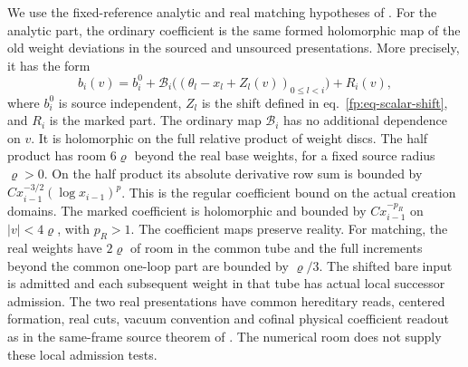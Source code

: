 \documentclass[11pt,letterpaper,reqno]{amsart}
\numberwithin{equation}{section}
\renewcommand{\eqref}[1]{\textup{eq.~\ref{#1}}}
\theoremstyle{definition}
\theoremstyle{remark}
\begin{document}
We use the fixed-reference analytic and real matching hypotheses of
\cite[Propositions~4.1 and~4.2]{SI}. For the analytic part, the
ordinary coefficient is the same formed holomorphic map of the
old weight deviations in the sourced and unsourced presentations.
More precisely, it has the form
\[
 b_i(v)=b_i^0+\mathcal B_i\bigl(
        (\theta_l-x_l+Z_l(v))_{0\le l<i}\bigr)+R_i(v),
\]
where \(b_i^0\) is source independent, \(Z_l\) is the shift
defined in \eqref{fp:eq-scalar-shift}, and \(R_i\) is the marked
part. The ordinary map \(\mathcal B_i\) has no additional
dependence on \(v\). It is holomorphic on the full relative
product of weight discs. The half product has room
\(6\varrho\) beyond the real base weights, for a fixed source radius
\(\varrho>0\). On the half product its absolute derivative row sum is
bounded by
\(C x_{i-1}^{-3/2}(\log x_{i-1})^p\).
This is the regular coefficient bound on the actual creation
domains. The marked coefficient is holomorphic and bounded by
\(C x_{i-1}^{-p_R}\) on \(|v|<4\varrho\), with \(p_R>1\). The
coefficient maps preserve reality. For matching, the real weights have \(2\varrho\) of room in the
common tube and the full increments beyond the common one-loop
part are bounded by \(\varrho/3\). The shifted bare input is
admitted and each subsequent weight in that tube has actual local
successor admission. The two real
presentations have common hereditary reads, centered formation,
real cuts, vacuum convention and cofinal physical coefficient
readout as in the same-frame source theorem of \cite{SI}.
The numerical room does not supply these local admission tests.
\end{document}
